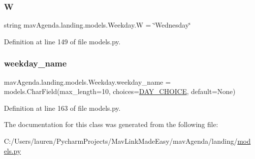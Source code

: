 \subsubsection{\texorpdfstring{W}{W}}
{\footnotesize\ttfamily string mav\+Agenda.\+landing.\+models.\+Weekday.\+W = \char`\"{}Wednesday\char`\"{}\hspace{0.3cm}{\ttfamily [static]}}



Definition at line 149 of file models.\+py.

\mbox{\label{classmavAgenda_1_1landing_1_1models_1_1Weekday_a601988941ecd2df730cdc5e124443059}} 
\subsubsection{\texorpdfstring{weekday\+\_\+name}{weekday\_name}}
{\footnotesize\ttfamily mav\+Agenda.\+landing.\+models.\+Weekday.\+weekday\+\_\+name = models.\+Char\+Field(max\+\_\+length=10, choices=\mbox{\hyperlink{classmavAgenda_1_1landing_1_1models_1_1Weekday_ad3467f25c1365f72054c0ac79dd457ef}{D\+A\+Y\+\_\+\+C\+H\+O\+I\+CE}}, default=None)\hspace{0.3cm}{\ttfamily [static]}}



Definition at line 163 of file models.\+py.



The documentation for this class was generated from the following file\+:\begin{DoxyCompactItemize}
\item 
C\+:/\+Users/lauren/\+Pycharm\+Projects/\+Mav\+Link\+Made\+Easy/mav\+Agenda/landing/\mbox{\hyperlink{models_8py}{models.\+py}}\end{DoxyCompactItemize}
